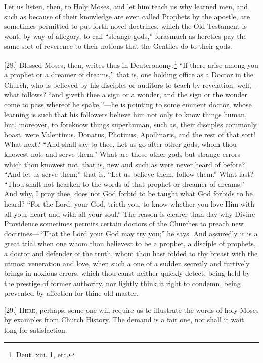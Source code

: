 Let us listen, then, to Holy Moses, and let him teach us why learned men, and such as because of their knowledge are even called Prophets by the apostle, are sometimes permitted to put forth novel doctrines, which the Old Testament is wont, by way of allegory, to call “strange gods,” forasmuch as heretics pay the same sort of reverence to their notions that the Gentiles do to their gods.

[28.] Blessed Moses, then, writes thus in Deuteronomy:\footnote{Deut. xiii. 1, etc.} “If there arise among you a prophet or a dreamer of dreams,” that is, one holding office as a Doctor in the Church, who is believed by his disciples or auditors to teach by revelation: well,—what follows? “and giveth thee a sign or a wonder, and the sign or the wonder come to pass whereof he spake,”—he is pointing to some eminent doctor, whose learning is such that his followers believe him not only to know things human, but, moreover, to foreknow things superhuman, such as, their disciples commonly boast, were Valentinus, Donatus, Photinus, Apollinaris, and the rest of that sort! What next? “And shall say to thee, Let us go after other gods, whom thou knowest not, and serve them.” What are those other gods but strange errors which thou knowest not, that is, new and such as were never heard of before? “And let us serve them;” that is, “Let us believe them, follow them.” What last? “Thou shalt not hearken to the words of that prophet or dreamer of dreams.” And why, I pray thee, does not God forbid to be taught what God forbids to be heard? “For the Lord, your God, trieth you, to know whether you love Him with all your heart and with all your soul.” The reason is clearer than day why Divine Providence sometimes permits certain doctors of the Churches to preach new doctrines—“That the Lord your God may try you;” he says. And assuredly it is a great trial when one whom thou believest to be a prophet, a disciple of prophets, a doctor and defender of the truth, whom thou hast folded to thy breast with the utmost veneration and love, when such a one of a sudden secretly and furtively brings in noxious errors, which thou canst neither quickly detect, being held by the prestige of former authority, nor lightly think it right to condemn, being prevented by affection for thine old master.


[29.] \textsc{Here}, perhaps, some one will require us to illustrate the words of holy Moses by examples from Church History. The demand is a fair one, nor shall it wait long for satisfaction.

